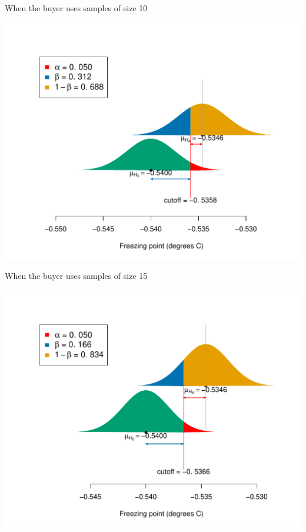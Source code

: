 \documentclass[10pt]{beamer}\usepackage[]{graphicx}\usepackage[]{color}
\makeatletter
\def\maxwidth{ %
  \ifdim\Gin@nat@width>\linewidth
    \linewidth
  \else
    \Gin@nat@width
  \fi
}
\newenvironment{knitrout}{}{} %
\makeatother
\begin{document}
\begin{frame}[fragile]{When the buyer uses samples of size 10}
\begin{knitrout}\tiny
{}\color{fgcolor}

{\centering \includegraphics[width=\maxwidth]{figure/unnamed-chunk-12-1} 

}



\end{knitrout}
\end{frame}

\begin{frame}[fragile]{When the buyer uses samples of size 15}
\begin{knitrout}\tiny
{}\color{fgcolor}

{\centering \includegraphics[width=\maxwidth]{figure/unnamed-chunk-13-1} 

}



\end{knitrout}
\end{frame}
\end{document}
